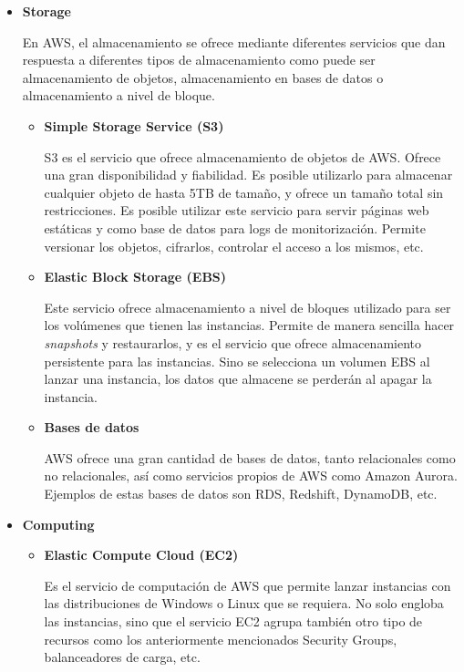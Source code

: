 \documentclass[../../memoria.tex]{subfiles}
\begin{document}
\begin{itemize}
      \item \textbf{Storage}
            \par
            En AWS, el almacenamiento se ofrece mediante diferentes servicios que dan respuesta a diferentes tipos de almacenamiento como puede ser almacenamiento de objetos, almacenamiento en bases de datos o almacenamiento a nivel de bloque.
            \begin{itemize}
                  \item \textbf{Simple Storage Service (S3)}
                        \par
                        S3 es el servicio que ofrece almacenamiento de objetos de AWS. Ofrece una gran disponibilidad y fiabilidad. Es posible utilizarlo para almacenar cualquier objeto de hasta 5TB de tamaño, y ofrece un tamaño total sin restricciones. Es posible utilizar este servicio para servir páginas web estáticas y como base de datos para logs de monitorización. Permite versionar los objetos, cifrarlos, controlar el acceso a los mismos, etc.
                  \item \textbf{Elastic Block Storage (EBS)}
                        \par
                        Este servicio ofrece almacenamiento a nivel de bloques utilizado para ser los volúmenes que tienen las instancias. Permite de manera sencilla hacer \textit{snapshots} y restaurarlos, y es el servicio que ofrece almacenamiento persistente para las instancias. Sino se selecciona un volumen EBS al lanzar una instancia, los datos que almacene se perderán al apagar la instancia.
                  \item \textbf{Bases de datos}
                        \par
                        AWS ofrece una gran cantidad de bases de datos, tanto relacionales como no relacionales, así como servicios propios de AWS como Amazon Aurora. Ejemplos de estas bases de datos son RDS, Redshift, DynamoDB, etc.
            \end{itemize}

      \item \textbf{Computing}
            \begin{itemize}
                  \item \textbf{Elastic Compute Cloud (EC2)}
                        \par
                        Es el servicio de computación de AWS que permite lanzar instancias con las distribuciones de Windows o Linux que se requiera. No solo engloba las instancias, sino que el servicio EC2 agrupa también otro tipo de recursos como los anteriormente mencionados Security Groups, balanceadores de carga, etc.
            \end{itemize}


\end{itemize}
\end{document}
